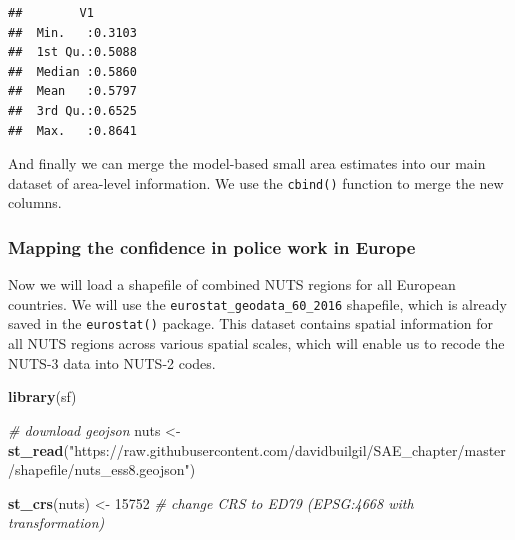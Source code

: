 \documentclass[
]{article}
\newenvironment{Shaded}{\begin{snugshade}}{\end{snugshade}}
\newcommand{\CommentTok}[1]{\textcolor[rgb]{0.56,0.35,0.01}{\textit{#1}}}
\newcommand{\DataTypeTok}[1]{\textcolor[rgb]{0.13,0.29,0.53}{#1}}
\newcommand{\DecValTok}[1]{\textcolor[rgb]{0.00,0.00,0.81}{#1}}
\newcommand{\KeywordTok}[1]{\textcolor[rgb]{0.13,0.29,0.53}{\textbf{#1}}}
\newcommand{\NormalTok}[1]{#1}
\newcommand{\OperatorTok}[1]{\textcolor[rgb]{0.81,0.36,0.00}{\textbf{#1}}}
\newcommand{\StringTok}[1]{\textcolor[rgb]{0.31,0.60,0.02}{#1}}
\begin{document}
\begin{verbatim}
##        V1        
##  Min.   :0.3103  
##  1st Qu.:0.5088  
##  Median :0.5860  
##  Mean   :0.5797  
##  3rd Qu.:0.6525  
##  Max.   :0.8641
\end{verbatim}

And finally we can merge the model-based small area estimates into our
main dataset of area-level information. We use the \texttt{cbind()}
function to merge the new columns.

\begin{Shaded}
\end{Shaded}

\hypertarget{mapping-the-confidence-in-police-work-in-europe}{%
\subsubsection{Mapping the confidence in police work in
Europe}\label{mapping-the-confidence-in-police-work-in-europe}}

Now we will load a shapefile of combined NUTS regions for all European
countries. We will use the \texttt{eurostat\_geodata\_60\_2016}
shapefile, which is already saved in the \texttt{eurostat()} package.
This dataset contains spatial information for all NUTS regions across
various spatial scales, which will enable us to recode the NUTS-3 data
into NUTS-2 codes.

\begin{Shaded}
\begin{Highlighting}[]
\KeywordTok{library}\NormalTok{(sf)}

\CommentTok{# download geojson}
\NormalTok{nuts <-}\StringTok{ }\KeywordTok{st_read}\NormalTok{(}\StringTok{"https://raw.githubusercontent.com/davidbuilgil/SAE_chapter/master/shapefile/nuts_ess8.geojson"}\NormalTok{)}

\KeywordTok{st_crs}\NormalTok{(nuts) <-}\StringTok{ }\DecValTok{15752} \CommentTok{# change CRS to ED79 (EPSG:4668 with transformation)}
\end{Highlighting}
\end{Shaded}
\end{document}
